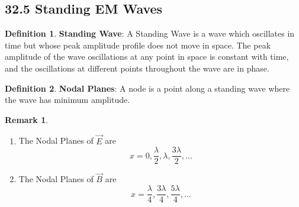 \documentclass[12pt]{amsart}
\theoremstyle{definition}
\newtheorem{definition}{Definition} %
\newtheorem*{remark}{Remark}        %
\numberwithin{equation}{theorem}    %
\begin{document}
\subsection*{32.5 Standing EM Waves}

\begin{definition}
    \textbf{Standing Wave}:
    A Standing Wave is a wave which oscillates in time but whose peak amplitude profile does not move in space. The peak amplitude of the wave oscillations at any point in space is constant with time, and the oscillations at different points throughout the wave are in phase.
\end{definition}

\begin{definition}
    \textbf{Nodal Planes}:
    A node is a point along a standing wave where the wave has minimum amplitude.
    \begin{remark}
        \begin{enumerate}
            \item The Nodal Planes of $\vec{E}$ are $$x = 0, \frac{\lambda}{2}, \lambda, 
            \frac{3\lambda}{2},...$$
            \item The Nodal Planes of $\vec{B}$ are $$x = \frac{\lambda}{4}, \frac{3\lambda}{4},
            \frac{5\lambda}{4},...$$
        \end{enumerate}
        
    \end{remark}
\end{definition}
\end{document}
